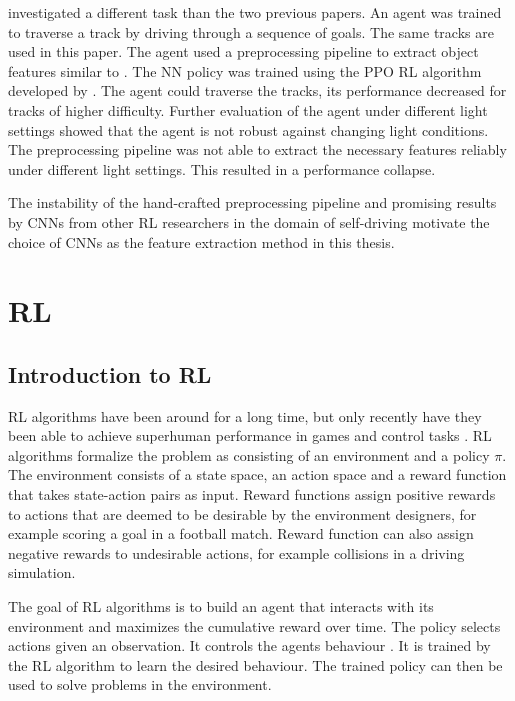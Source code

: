 \textcite{maximilian} investigated a different task than the two previous papers. An agent was trained to traverse a track by driving through a sequence of goals. The same tracks are used in this paper. The agent used a preprocessing pipeline to extract object features similar to \textcite{jonas_koenig}. The \ac{NN} policy was trained using the \ac{PPO} \ac{RL} algorithm developed by \textcite{ppo}. The agent could traverse the tracks, its performance decreased for tracks of higher difficulty. Further evaluation of the agent under different light settings showed that the agent is not robust against changing light conditions. The preprocessing pipeline was not able to extract the necessary features reliably under different light settings. This resulted in a performance collapse.

The instability of the hand-crafted preprocessing pipeline and promising results by \acp{CNN} from other RL researchers in the domain of self-driving \textcite{neptune} motivate the choice of \acp{CNN} as the feature extraction method in this thesis. 


\section{\acl{RL}}

\subsection{Introduction to \ac{RL}}

\ac{RL} algorithms have been around for a long time, but only recently have they been able to achieve superhuman performance in games and control tasks \autocite{atari}. \ac{RL} algorithms formalize the problem as consisting of an environment and a policy $\pi$. The environment consists of a state space, an action space and a reward function that takes state-action pairs as input. Reward functions assign positive rewards to actions that are deemed to be desirable by the environment designers, for example scoring a goal in a football match. Reward function can also assign negative rewards to undesirable actions, for example collisions in a driving simulation. 

The goal of \ac{RL} algorithms is to build an agent that interacts with its environment and maximizes the cumulative reward over time. The policy selects actions given an observation. It controls the agents behaviour \autocite{rlbook2020}. It is trained by the \ac{RL} algorithm to learn the desired behaviour. The trained policy can then be used to solve problems in the environment. 

